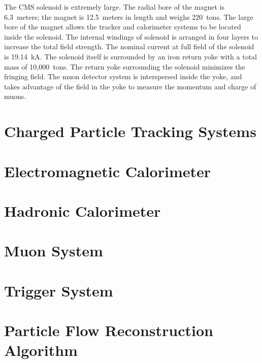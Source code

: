 The CMS solenoid is extremely large.  The radial bore of the magnet is
6.3~meters; the magnet is 12.5~meters in length and weighs 220~tons.  The large
bore of the magnet allows the tracker and calorimeter systems to be located
inside the solenoid.  The internal windings of solenoid is arranged in four
layers to increase the total field strength.  The nominal current at full field
of the solenoid is 19.14~kA.  The solenoid itself is surrounded by an iron
return yoke with a total mass of 10,000~tons.  The return yoke surrounding the
solenoid minimizes the fringing field.  The muon detector system is interspersed
inside the yoke, and takes advantage of the field in the yoke to measure the
momentum and charge of muons.

\section{Charged Particle Tracking Systems}
\section{Electromagnetic Calorimeter}
\section{Hadronic Calorimeter}
\section{Muon System}
\section{Trigger System}
\section{Particle Flow Reconstruction Algorithm}
\ifx\master\undefined\fi
